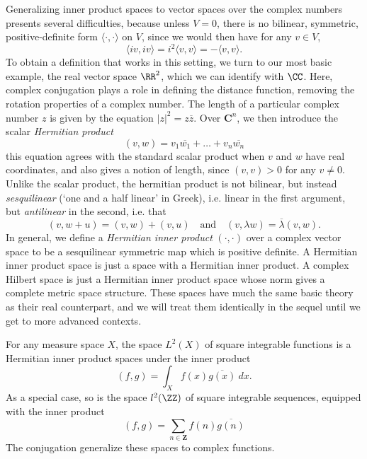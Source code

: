 Generalizing inner product spaces to vector spaces over the complex numbers presents several difficulties, because unless $V = 0$, there is no bilinear, symmetric, positive-definite form $\langle \cdot, \cdot \rangle$ on $V$, since we would then have for any $v \in V$,
%
\[ \langle iv, iv \rangle = i^2 \langle v, v \rangle = - \langle v, v \rangle. \]
%
To obtain a definition that works in this setting, we turn to our most basic example, the real vector space $\RR^2$, which we can identify with $\CC$. Here, complex conjugation plays a role in defining the distance function, removing the rotation properties of a complex number. The length of a particular complex number $z$ is given by the equation $|z|^2 = z \overline{z}$. Over $\mathbf{C}^n$, we then introduce the scalar {\it Hermitian product}
%
\[ (v,w) = v_1 \overline{w_1} + \dots + v_n \overline{w_n} \]
%
this equation agrees with the standard scalar product when $v$ and $w$ have real coordinates, and also gives a notion of length, since $(v,v) > 0$ for any $v \neq 0$. Unlike the scalar product, the hermitian product is not bilinear, but instead \emph{sesquilinear} (`one and a half linear' in Greek), i.e. linear in the first argument, but {\it antilinear} in the second, i.e. that
%
\[ (v, w + u) = (v,w) + (v,u) \quad\text{and}\quad (v, \lambda w) = \overline{\lambda} (v,w). \]
%
In general, we define a \emph{Hermitian inner product} $(\cdot, \cdot)$ over a complex vector space to be a sesquilinear symmetric map which is positive definite. A Hermitian inner product space is just a space with a Hermitian inner product. A complex Hilbert space is just a Hermitian inner product space whose norm gives a complete metric space structure. These spaces have much the same basic theory as their real counterpart, and we will treat them identically in the sequel until we get to more advanced contexts.

\begin{example}
    For any measure space $X$, the space $L^2(X)$ of square integrable functions is a  Hermitian inner product spaces under the inner product
    \[ (f,g) = \int_X f(x) \overline{g(x)}\ dx. \]
    As a special case, so is the space $l^2(\ZZ)$ of square integrable sequences, equipped with the inner product
    \[ (f,g) = \sum_{n \in \mathbf{Z}} f(n) \overline{g(n)} \]
    The conjugation generalize these spaces to complex functions.
\end{example}

